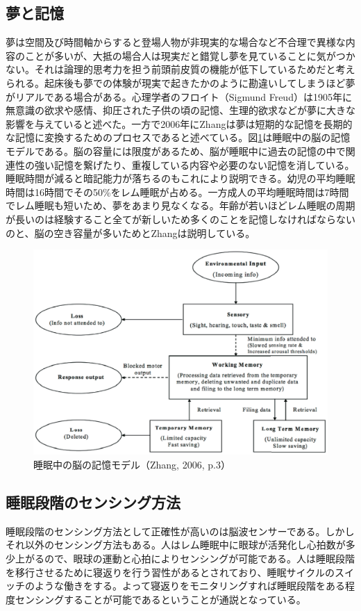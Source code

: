 \subsection{夢と記憶}
夢は空間及び時間軸からすると登場人物が非現実的な場合など不合理で異様な内容のことが多いが、大抵の場合人は現実だと錯覚し夢を見ていることに気がつかない。それは論理的思考力を担う前頭前皮質の機能が低下しているためだと考えられる\cite{cortex}。起床後も夢での体験が現実で起きたかのように勘違いしてしまうほど夢がリアルである場合がある。心理学者のフロイト（Sigmund Freud）は1905年に無意識の欲求や感情、抑圧された子供の頃の記憶、生理的欲求などが夢に大きな影響を与えていると述べた\cite{freud}。一方で2006年にZhangは夢は短期的な記憶を長期的な記憶に変換するためのプロセスであると述べている。図\ref{brainZhang}は睡眠中の脳の記憶モデルである\cite{Zhang}。脳の容量には限度があるため、脳が睡眠中に過去の記憶の中で関連性の強い記憶を繋げたり、重複している内容や必要のない記憶を消している\cite{Zhang}。睡眠時間が減ると暗記能力が落ちるのもこれにより説明できる。幼児の平均睡眠時間は16時間でその50\%をレム睡眠が占める。一方成人の平均睡眠時間は7時間でレム睡眠も短いため、夢をあまり見なくなる。年齢が若いほどレム睡眠の周期が長いのは経験すること全てが新しいため多くのことを記憶しなければならないのと、脳の空き容量が多いためとZhangは説明している\cite{Zhang}。

\begin{figure}[htbp]
\begin{center}
\includegraphics[width=13cm]{eps/sleepBrainModel.eps}
\caption{睡眠中の脳の記憶モデル（Zhang, 2006, p.3）}
\label{brainZhang}
\end{center}
\end{figure}

\subsection{睡眠段階のセンシング方法}
睡眠段階のセンシング方法として正確性が高いのは脳波センサーである\cite{hypnogram}。しかしそれ以外のセンシング方法もある。人はレム睡眠中に眼球が活発化し心拍数が多少上がるので、眼球の運動と心拍によりセンシングが可能である。人は睡眠段階を移行させるために寝返りを行う習性があるとされており、睡眠サイクルのスイッチのような働きをする\cite{negaeri}。よって寝返りをモニタリングすれば睡眠段階をある程度センシングすることが可能であるということが通説となっている。

